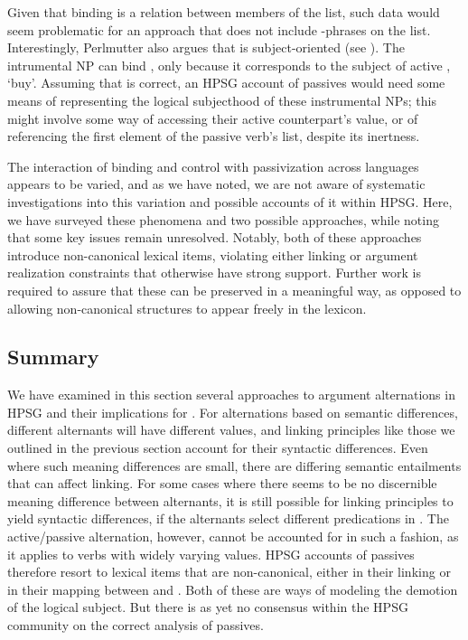 \documentclass[output=paper
 	        ,biblatex
                ,babelshorthands
                ,newtxmath
                ,draftmode
                ,colorlinks, citecolor=brown
]{langscibook}
\begin{document}
\noindent
Given that binding is a relation between members of the \argst list, such data would seem problematic for an approach that does not include -phrases on the \argst list.
Interestingly, Perlmutter also argues that   is subject-oriented (see ).
The intrumental NP  can bind , only because it corresponds to the subject of active , `buy'.
Assuming that is correct, an HPSG account of  passives would need some means of representing the logical subjecthood of these instrumental NPs; this might involve some way of accessing their active counterpart's \subj value, or of referencing the first element of the passive verb's \argst list, despite its inertness.

The interaction of binding and control with passivization across languages appears to be varied, and as we have noted, we are not aware of systematic investigations into this variation and possible accounts of it within HPSG.
Here, we have surveyed these phenomena and two possible approaches, while noting that some key issues remain unresolved.
Notably, both of these approaches introduce non-canonical lexical items, violating either linking or argument realization constraints that otherwise have strong support. 
Further work is required to assure that these can be preserved in a meaningful way, as opposed to allowing non-canonical structures to appear freely in the lexicon.

\subsection{Summary}

We have examined in this section several approaches to argument alternations in HPSG and their implications for \argst.
For alternations based on semantic differences, different alternants will have different  values, and linking principles like those we outlined in the previous section account for their syntactic differences.
Even where such meaning differences are small, there are differing semantic entailments that can affect linking.
For some cases where there seems to be no discernible meaning difference between alternants, it is still possible for linking principles to yield syntactic differences, if the alternants select different  predications in .
The active/passive alternation, however, cannot be accounted for in such a fashion, as it applies to verbs with widely varying  values.
HPSG accounts of passives therefore resort to lexical items that are non-canonical, either in their linking or in their mapping between \argst and .
Both of these are ways of modeling the demotion of the logical subject.
But there is as yet no consensus within the HPSG community on the correct analysis of passives.
\end{document}
